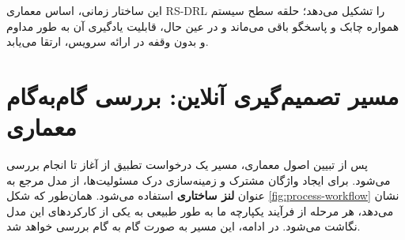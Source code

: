 \documentclass[oneside,openany,phd]{TMU-Thesis}
\begin{document}
\begin{table}[H]

\centering

\caption{طبقه‌بندی زمانی فرآیندهای معماری RS-DRL}

\label{tab:process-classification}


\end{table}



این ساختار زمانی، اساس معماری RS-DRL را تشکیل می‌دهد؛ حلقه سطح سیستم همواره چابک و پاسخگو باقی می‌ماند و در عین حال، قابلیت یادگیری آن به طور مداوم و بدون وقفه در ارائه سرویس، ارتقا می‌یابد.



\section{مسیر تصمیم‌گیری آنلاین: بررسی گام‌به‌گام معماری}

\label{sec:online-decision}



پس از تبیین اصول معماری، مسیر یک درخواست تطبیق از آغاز تا انجام بررسی می‌شود. برای ایجاد واژگان مشترک و زمینه‌سازی درک مسئولیت‌ها، از مدل مرجع  \cite{kephart2003vision} به عنوان \textbf{لنز ساختاری} استفاده می‌شود. همان‌طور که شکل \ref{fig:process-workflow} نشان می‌دهد، هر مرحله از فرآیند یکپارچه ما به طور طبیعی به یکی از کارکردهای این مدل نگاشت می‌شود. در ادامه، این مسیر به صورت گام به گام بررسی خواهد شد.
\end{document}

